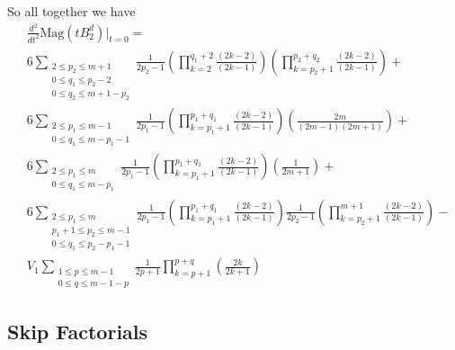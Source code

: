 \documentclass[11pt]{article}
\theoremstyle{definition}
\theoremstyle{definition}
\theoremstyle{plain}
\theoremstyle{plain}
\theoremstyle{plain}
\theoremstyle{definition}
\begin{document}
So all together we have
\begin{align*}
&\frac{d^2}{dt^2}\text{Mag}(tB_2^d)\big\vert_{t=0} = \\
&6\sum\limits_{\substack{2\leq p_2\leq m+1 \\ 0\leq q_1 \leq p_2-2 \\ 0\leq q_2 \leq m+1-p_2}}\frac{1}{2p_2-1}\left(\prod\limits_{k=2}^{q_1+2}\frac{(2k-2)}{(2k-1)}\right)\left(\prod\limits_{k=p_2+1}^{p_2+q_2}\frac{(2k-2)}{(2k-1)}\right) + \\
&6\sum\limits_{\substack{2\leq p_1\leq m-1 \\ 0\leq q_1\leq m-p_1-1}}\frac{1}{2p_1-1}\left(\prod\limits_{k=p_1+1}^{p_1+q_1}\frac{(2k-2)}{(2k-1)}\right)\left(\frac{2m}{(2m-1)(2m+1)}\right) + \\
&6\sum\limits_{\substack{2\leq p_1\leq m \\ 0\leq q_1\leq m-p_1}}\frac{1}{2p_1-1}\left(\prod\limits_{k=p_1+1}^{p_1+q_1}\frac{(2k-2)}{(2k-1)}\right)\left(\frac{1}{2m+1}\right) + \\
&6\sum\limits_{\substack{2\leq p_1\leq m \\ p_1+1\leq p_2 \leq m-1 \\ 0\leq q_1\leq p_2-p_1-1 }}\frac{1}{2p_1-1}\left(\prod\limits_{k=p_1+1}^{p_1+q_1}\frac{(2k-2)}{(2k-1)}\right)\frac{1}{2p_2-1}\left(\prod\limits_{k=p_2+1}^{m+1}\frac{(2k-2)}{(2k-1)}\right) - \\
&V_{1}\sum\limits_{\substack{1\leq p \leq m-1 \\ 0 \leq q \leq m - 1 - p}}\frac{1}{2p+1}\prod\limits_{k=p+1}^{p+q}\left(\frac{2k}{2k+1}\right)
\end{align*}

\subsection*{Skip Factorials}
\end{document}
